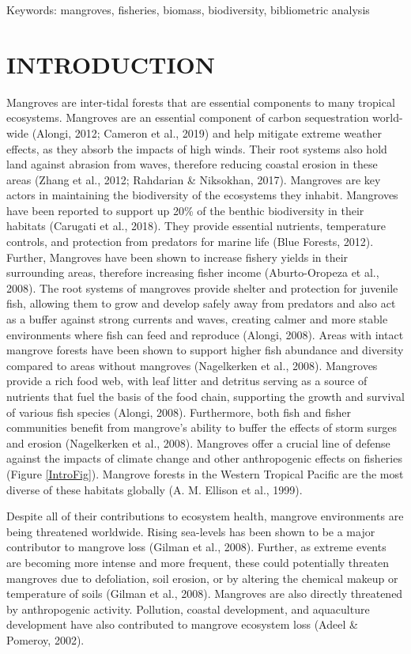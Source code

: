\documentclass[
  12pt,
]{article}
\begin{document}
Keywords: mangroves, fisheries, biomass, biodiversity, bibliometric analysis

\section{INTRODUCTION}\label{introduction}

Mangroves are inter-tidal forests that are essential components to many tropical ecosystems. Mangroves are an essential component of carbon sequestration world-wide (Alongi, 2012; Cameron et al., 2019) and help mitigate extreme weather effects, as they absorb the impacts of high winds. Their root systems also hold land against abrasion from waves, therefore reducing coastal erosion in these areas (Zhang et al., 2012; Rahdarian \& Niksokhan, 2017). Mangroves are key actors in maintaining the biodiversity of the ecosystems they inhabit. Mangroves have been reported to support up 20\% of the benthic biodiversity in their habitats (Carugati et al., 2018). They provide essential nutrients, temperature controls, and protection from predators for marine life (Blue Forests, 2012). Further, Mangroves have been shown to increase fishery yields in their surrounding areas, therefore increasing fisher income (Aburto-Oropeza et al., 2008). The root systems of mangroves provide shelter and protection for juvenile fish, allowing them to grow and develop safely away from predators and also act as a buffer against strong currents and waves, creating calmer and more stable environments where fish can feed and reproduce (Alongi, 2008). Areas with intact mangrove forests have been shown to support higher fish abundance and diversity compared to areas without mangroves (Nagelkerken et al., 2008). Mangroves provide a rich food web, with leaf litter and detritus serving as a source of nutrients that fuel the basis of the food chain, supporting the growth and survival of various fish species (Alongi, 2008). Furthermore, both fish and fisher communities benefit from mangrove's ability to buffer the effects of storm surges and erosion (Nagelkerken et al., 2008). Mangroves offer a crucial line of defense against the impacts of climate change and other anthropogenic effects on fisheries (Figure \ref{IntroFig}). Mangrove forests in the Western Tropical Pacific are the most diverse of these habitats globally (A. M. Ellison et al., 1999).

Despite all of their contributions to ecosystem health, mangrove environments are being threatened worldwide. Rising sea-levels has been shown to be a major contributor to mangrove loss (Gilman et al., 2008). Further, as extreme events are becoming more intense and more frequent, these could potentially threaten mangroves due to defoliation, soil erosion, or by altering the chemical makeup or temperature of soils (Gilman et al., 2008). Mangroves are also directly threatened by anthropogenic activity. Pollution, coastal development, and aquaculture development have also contributed to mangrove ecosystem loss (Adeel \& Pomeroy, 2002).
\end{document}
